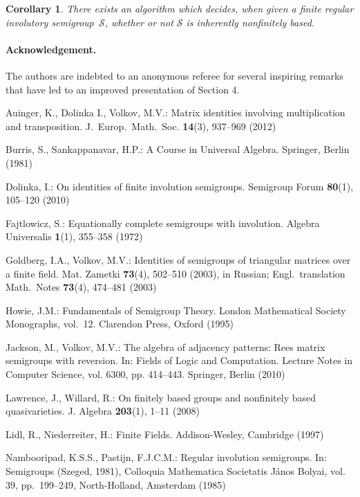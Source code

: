 \documentclass[smallextended]{svjour3}
\newcommand{\is}{involutory semi\-group}
\newcommand{\infb}{inherently non\-finitely based}
\newtheorem{Cor}[Thm]{Corollary}
\begin{document}
\begin{Cor}
There exists an algorithm which decides, when given a  finite regular \is\ $\mathcal{S}$, whether or not $\mathcal{S}$ is \infb.
\end{Cor}

\paragraph*{Acknowledgement.} The authors are indebted to an anonymous referee for several inspiring remarks that have led to an improved
presentation of Section 4.

\begin{thebibliography}{99}
Auinger, K., Dolinka I., Volkov, M.V.: Matrix identities involving multiplication and transposition. J.~Europ.\ Math.\ Soc. \textbf{14}(3),
937--969 (2012)

Burris, S., Sankappanavar, H.P.: A Course in Universal Algebra. Springer, Berlin (1981)

Dolinka, I.: On identities of finite involution semigroups. Semigroup Forum \textbf{80}(1), 105--120 (2010)

Fajtlowicz, S.: Equationally complete semigroups with involution. Algebra Universalis \textbf{1}(1), 355--358 (1972)

Goldberg, I.A., Volkov, M.V.: Identities of semigroups of triangular matrices over a finite field. Mat. Zametki \textbf{73}(4), 502--510
(2003), in Russian; Engl.\ translation Math.\ Notes \textbf{73}(4), 474--481 (2003)

Howie, J.M.: Fundamentals of Semigroup Theory. London Mathematical Society Monographs, vol.~12. Clarendon Press, Oxford (1995)

Jackson, M., Volkov, M.V.: The algebra of adjacency patterns: Rees matrix semigroups with reversion. In: Fields of Logic and Computation.
Lecture Notes in Computer Science, vol. 6300, pp. 414--443. Springer, Berlin (2010)

Lawrence, J., Willard, R.: On finitely based groups and nonfinitely based quasivarieties. J. Algebra \textbf{203}(1), 1--11 (2008)

Lidl, R., Niederreiter, H.: Finite Fields. Addison-Wesley, Cambridge (1997)

Nambooripad, K.S.S., Pastijn, F.J.C.M.: Regular involution semigroups. In: Semigroups (Szeged, 1981),
Colloquia Mathematica Societatis J\'anos Bolyai, vol. 39, pp.~199--249, North-Holland, Amsterdam (1985)


\end{thebibliography}
\end{document}
